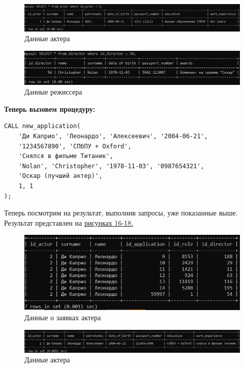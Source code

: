 \documentclass[11pt,a4paper,final]{article} %
\begin{document}
\begin{figure}[H]
	\centering
	\includegraphics[width=1.0\linewidth]{pic15.png}
	\caption{Данные актера}
	\label{fig:pic14}
\end{figure}

\begin{figure}[H]
	\centering
	\includegraphics[width=1.0\linewidth]{pic14.png}
	\caption{Данные режиссера}
	\label{fig:pic15}
\end{figure}


\textbf{Теперь вызовем процедуру:} 

\begin{lstlisting}
CALL new_application(
	'Ди Каприо', 'Леонардо', 'Алексеевич', '2004-06-21',        
	'1234567890', 'СПбПУ + Oxford',
	'Снялся в фильме Титаник',       
	'Nolan', 'Christopher', '1978-11-03', '0987654321',        
	'Оскар (лучший актер)',
	1, 1                   
);
\end{lstlisting}

Теперь посмотрим на результат, выполнив запросы, уже показанные выше. Результат представлен на  \hyperref[fig:pic14]{рисунках 16-18.}

\newpage

\begin{figure}[H]
	\centering
	\includegraphics[width=1.0\linewidth]{pic16.png}
	\caption{Данные о заявках актера}
	\label{fig:pic16}
\end{figure}

\begin{figure}[H]
	\centering
	\includegraphics[width=1.0\linewidth]{pic17.png}
	\caption{Данные актера}
	\label{fig:pic17}
\end{figure}
\end{document}
